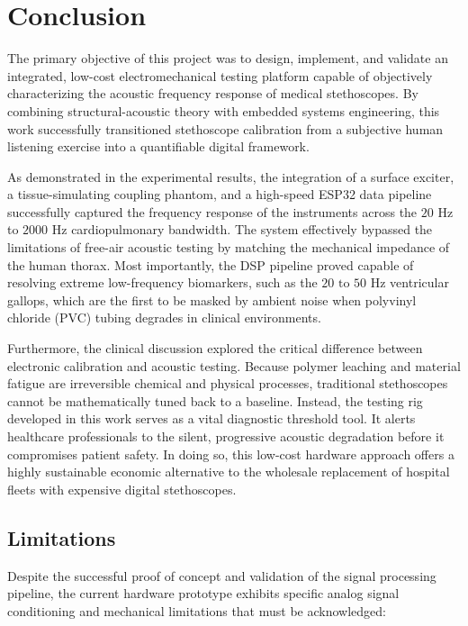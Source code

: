 \chapter{Conclusion}

The primary objective of this project was to design, implement, and validate an integrated, low-cost electromechanical testing platform capable of objectively characterizing the acoustic frequency response of medical stethoscopes. By combining structural-acoustic theory with embedded systems engineering, this work successfully transitioned stethoscope calibration from a subjective human listening exercise into a quantifiable digital framework.

As demonstrated in the experimental results, the integration of a surface exciter, a tissue-simulating coupling phantom, and a high-speed ESP32 data pipeline successfully captured the frequency response of the instruments across the $20\text{ Hz}$ to $2000\text{ Hz}$ cardiopulmonary bandwidth. The system effectively bypassed the limitations of free-air acoustic testing by matching the mechanical impedance of the human thorax. Most importantly, the DSP pipeline proved capable of resolving extreme low-frequency biomarkers, such as the $20\text{ to }50\text{ Hz}$ ventricular gallops, which are the first to be masked by ambient noise when polyvinyl chloride (PVC) tubing degrades in clinical environments.

Furthermore, the clinical discussion explored the critical difference between electronic calibration and acoustic testing. Because polymer leaching and material fatigue are irreversible chemical and physical processes, traditional stethoscopes cannot be mathematically tuned back to a baseline. Instead, the testing rig developed in this work serves as a vital diagnostic threshold tool. It alerts healthcare professionals to the silent, progressive acoustic degradation before it compromises patient safety. In doing so, this low-cost hardware approach offers a highly sustainable economic alternative to the wholesale replacement of hospital fleets with expensive digital stethoscopes.

\section{Limitations}

Despite the successful proof of concept and validation of the signal processing pipeline, the current hardware prototype exhibits specific analog signal conditioning and mechanical limitations that must be acknowledged:

